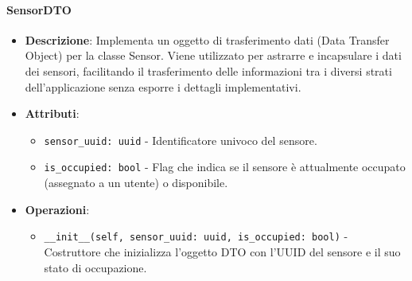 \documentclass[10pt]{article}
\begin{document}
    \paragraph{SensorDTO}
    \begin{itemize} 
    \item \textbf{Descrizione}: Implementa un oggetto di trasferimento dati (Data Transfer Object) per la classe Sensor. Viene utilizzato per astrarre e incapsulare i dati dei sensori, facilitando il trasferimento delle informazioni tra i diversi strati dell'applicazione senza esporre i dettagli implementativi.
    \item \textbf{Attributi}:
    \begin{itemize}
        \item \texttt{sensor\_uuid: uuid} - Identificatore univoco del sensore.
        \item \texttt{is\_occupied: bool} - Flag che indica se il sensore è attualmente occupato (assegnato a un utente) o disponibile.
    \end{itemize}
    
    \item \textbf{Operazioni}:
    \begin{itemize}
        \item \texttt{\_\_init\_\_(self, sensor\_uuid: uuid, is\_occupied: bool)} - Costruttore che inizializza l'oggetto DTO con l'UUID del sensore e il suo stato di occupazione.
    \end{itemize}
    \end{itemize}
\end{document}
